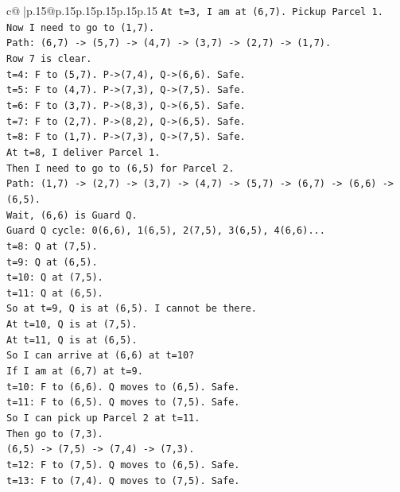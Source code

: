 \documentclass{article}
\begin{document}
{\begin{supertabular}{c@{$\;$}|p{.15\linewidth}@{}p{.15\linewidth}p{.15\linewidth}p{.15\linewidth}p{.15\linewidth}p{.15\linewidth}}
{{{\texttt{At t=3, I am at (6,7). Pickup Parcel 1.} \\
\texttt{Now I need to go to (1,7).} \\
\texttt{Path: (6,7) {-}> (5,7) {-}> (4,7) {-}> (3,7) {-}> (2,7) {-}> (1,7).} \\
\texttt{Row 7 is clear.} \\
\texttt{t=4: F to (5,7). P{-}>(7,4), Q{-}>(6,6). Safe.} \\
\texttt{t=5: F to (4,7). P{-}>(7,3), Q{-}>(7,5). Safe.} \\
\texttt{t=6: F to (3,7). P{-}>(8,3), Q{-}>(6,5). Safe.} \\
\texttt{t=7: F to (2,7). P{-}>(8,2), Q{-}>(6,5). Safe.} \\
\texttt{t=8: F to (1,7). P{-}>(7,3), Q{-}>(7,5). Safe.} \\
\texttt{At t=8, I deliver Parcel 1.} \\
\texttt{Then I need to go to (6,5) for Parcel 2.} \\
\texttt{Path: (1,7) {-}> (2,7) {-}> (3,7) {-}> (4,7) {-}> (5,7) {-}> (6,7) {-}> (6,6) {-}> (6,5).} \\
\texttt{Wait, (6,6) is Guard Q.} \\
\texttt{Guard Q cycle: 0(6,6), 1(6,5), 2(7,5), 3(6,5), 4(6,6)...} \\
\texttt{t=8: Q at (7,5).} \\
\texttt{t=9: Q at (6,5).} \\
\texttt{t=10: Q at (7,5).} \\
\texttt{t=11: Q at (6,5).} \\
\texttt{So at t=9, Q is at (6,5). I cannot be there.} \\
\texttt{At t=10, Q is at (7,5).} \\
\texttt{At t=11, Q is at (6,5).} \\
\texttt{So I can arrive at (6,6) at t=10?} \\
\texttt{If I am at (6,7) at t=9.} \\
\texttt{t=10: F to (6,6). Q moves to (6,5). Safe.} \\
\texttt{t=11: F to (6,5). Q moves to (7,5). Safe.} \\
\texttt{So I can pick up Parcel 2 at t=11.} \\
\texttt{Then go to (7,3).} \\
\texttt{(6,5) {-}> (7,5) {-}> (7,4) {-}> (7,3).} \\
\texttt{t=12: F to (7,5). Q moves to (6,5). Safe.} \\
\texttt{t=13: F to (7,4). Q moves to (7,5). Safe.} \\
}}}
\end{supertabular}}
\end{document}
